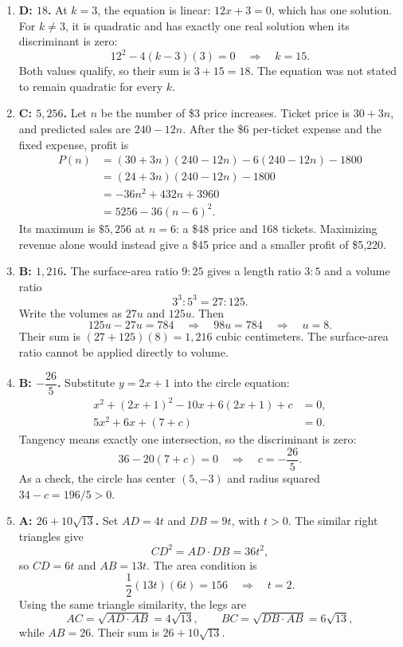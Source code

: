 \documentclass[12pt]{article}
\begin{document}
\begin{enumerate}[leftmargin=*,itemsep=1em]
  \vfill
  \item \textbf{D: $18$.} At $k=3$, the equation is linear: $12x+3=0$, which has one solution. For $k\ne3$, it is quadratic and has exactly one real solution when its discriminant is zero:
  \[
    12^2-4(k-3)(3)=0
    \quad\Longrightarrow\quad k=15.
  \]
  Both values qualify, so their sum is $\boxed{3+15=18}$. The equation was not stated to remain quadratic for every $k$.

  \vfill
  \newpage
  \item \textbf{C: $5{,}256$.} Let $n$ be the number of \$3 price increases. Ticket price is $30+3n$, and predicted sales are $240-12n$. After the \$6 per-ticket expense and the fixed expense, profit is
  \begin{align*}
    P(n)&=(30+3n)(240-12n)-6(240-12n)-1800\\
        &=(24+3n)(240-12n)-1800\\
        &=-36n^2+432n+3960\\
        &=5256-36(n-6)^2.
  \end{align*}
  Its maximum is $\boxed{\$5{,}256}$ at $n=6$: a \$48 price and 168 tickets. Maximizing revenue alone would instead give a \$45 price and a smaller profit of \$5,220.

  \vfill
  \item \textbf{B: $1{,}216$.} The surface-area ratio $9:25$ gives a length ratio $3:5$ and a volume ratio
  \[
    3^3:5^3=27:125.
  \]
  Write the volumes as $27u$ and $125u$. Then
  \[
    125u-27u=784
    \quad\Longrightarrow\quad 98u=784
    \quad\Longrightarrow\quad u=8.
  \]
  Their sum is $(27+125)(8)=\boxed{1{,}216}$ cubic centimeters. The surface-area ratio cannot be applied directly to volume.

  \vfill
  \item \textbf{B: $-\dfrac{26}{5}$.} Substitute $y=2x+1$ into the circle equation:
  \begin{align*}
    x^2+(2x+1)^2-10x+6(2x+1)+c&=0,\\
    5x^2+6x+(7+c)&=0.
  \end{align*}
  Tangency means exactly one intersection, so the discriminant is zero:
  \[
    36-20(7+c)=0
    \quad\Longrightarrow\quad \boxed{c=-\frac{26}{5}}.
  \]
  As a check, the circle has center $(5,-3)$ and radius squared $34-c=196/5>0$.

  \vfill
  \newpage
  \item \textbf{A: $26+10\sqrt{13}$.} Set $AD=4t$ and $DB=9t$, with $t>0$. The similar right triangles give
  \[
    CD^2=AD\cdot DB=36t^2,
  \]
  so $CD=6t$ and $AB=13t$. The area condition is
  \[
    \frac12(13t)(6t)=156
    \quad\Longrightarrow\quad t=2.
  \]
  Using the same triangle similarity, the legs are
  \[
    AC=\sqrt{AD\cdot AB}=4\sqrt{13},\qquad
    BC=\sqrt{DB\cdot AB}=6\sqrt{13},
  \]
  while $AB=26$. Their sum is $\boxed{26+10\sqrt{13}}$.


\end{enumerate}
\end{document}
